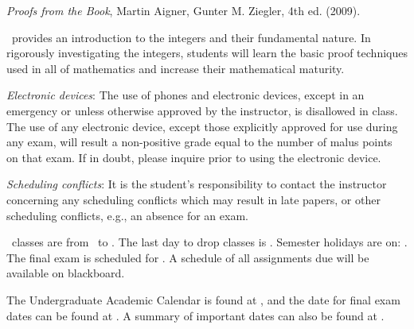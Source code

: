 \documentclass[11pt]{CAS_syllabus}
\begin{document}
\textit{Proofs from the Book}, Martin Aigner, Gunter M. Ziegler, 4th ed. (2009).

\Course\ provides an introduction to the integers and their fundamental nature.
In rigorously investigating the integers, students will learn the basic proof techniques used in all of mathematics and increase their mathematical maturity.




% 
% 


\begin{compactitem}
\item
\textit{Electronic devices}:
The use of phones and electronic devices, except in an emergency or unless
otherwise approved by the instructor,
is disallowed in class. The use of any electronic device, except those
explicitly approved for use during any exam, will result a non-positive grade equal to the number of malus points on that exam. 
If in doubt, please inquire prior to using the electronic device.
\item
\textit{Scheduling conflicts}:
It is the student's responsibility to contact the instructor concerning any
scheduling conflicts which may result in late papers, or other scheduling
conflicts, e.g., an absence for an exam.
\end{compactitem}


\Semester\ classes are from \Startsemesterclasses\ to \Endsemesterclasses.
The last day to drop classes is \Lastdropdate.
Semester holidays are on: \Semesterholidays.
The final exam is scheduled for \Semesterfinalexam.  A schedule of all assignments due will be available on blackboard.

{
\renewcommand{\syllabusfontstable}{\syllabusfontf}
\renewcommand{\tableheader}{\tableheaders}

}



\syllabusfontn
The Undergraduate Academic Calendar is found
at \Urls{\UndergraduatecalendarURL}, and the date for final exam dates can
be found at \Urls{\FinalexamURL}. A summary of important dates can also be
found at \Urls{\ImportantdatesURL}.




\end{document}
